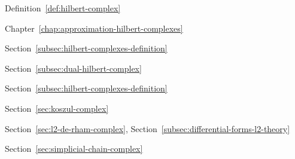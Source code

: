 \par\noindent\hspace*{1em}\label{index:complex-hilbert}\quad Definition~\ref{def:hilbert-complex}

\par\noindent\hspace*{2em}\label{index:complex-hilbert-approximation-of}\quad Chapter~\ref{chap:approximation-hilbert-complexes}

\par\noindent\hspace*{2em}\label{index:complex-hilbert-closed}\quad Section~\ref{subsec:hilbert-complexes-definition}

\par\noindent\hspace*{2em}\label{index:complex-hilbert-dual}\quad Section~\ref{subsec:dual-hilbert-complex}

\par\noindent\hspace*{2em}\label{index:complex-hilbert-fredholm}\quad Section~\ref{subsec:hilbert-complexes-definition}

\par\noindent\hspace*{1em}\label{index:complex-koszul}\quad Section~\ref{sec:koszul-complex}

\par\noindent\hspace*{1em}\label{index:complex-l-2-de-rham}\quad Section~\ref{sec:l2-de-rham-complex}, Section~\ref{subsec:differential-forms-l2-theory}

\par\noindent\hspace*{1em}\label{index:complex-simplicial}\quad Section~\ref{sec:simplicial-chain-complex}

